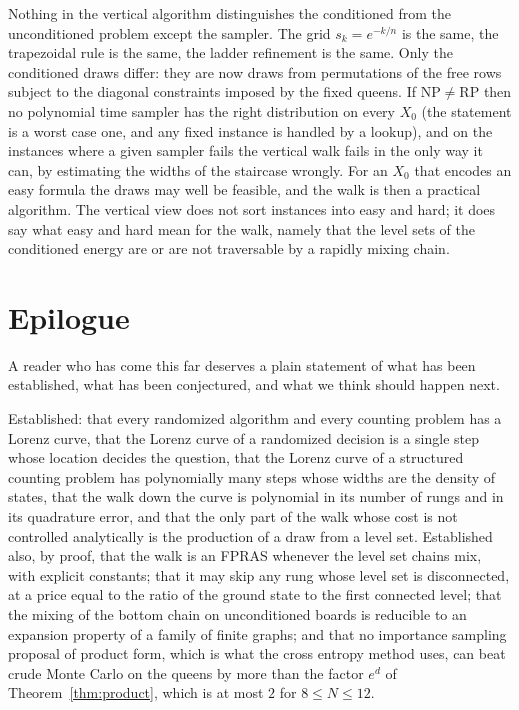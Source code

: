 \documentclass[11pt,twoside,openany]{book}
\theoremstyle{plain}
\theoremstyle{definition}
\theoremstyle{remark}
\newcommand{\RP}{\mathrm{RP}}
\newcommand{\NP}{\mathrm{NP}}
\begin{document}
Nothing in the vertical algorithm distinguishes the conditioned from the unconditioned problem except the sampler. The grid $s_k = e^{-k/n}$ is the same, the trapezoidal rule is the same, the ladder refinement is the same. Only the conditioned draws differ: they are now draws from permutations of the free rows subject to the diagonal constraints imposed by the fixed queens. If $\NP \neq \RP$ then no polynomial time sampler has the right distribution on every $X_0$ (the statement is a worst case one, and any fixed instance is handled by a lookup), and on the instances where a given sampler fails the vertical walk fails in the only way it can, by estimating the widths of the staircase wrongly. For an $X_0$ that encodes an easy formula the draws may well be feasible, and the walk is then a practical algorithm. The vertical view does not sort instances into easy and hard; it does say what easy and hard mean for the walk, namely that the level sets of the conditioned energy are or are not traversable by a rapidly mixing chain.







\chapter*{Epilogue}

A reader who has come this far deserves a plain statement of what has been established, what has been conjectured, and what we think should happen next.

Established: that every randomized algorithm and every counting problem has a Lorenz curve, that the Lorenz curve of a randomized decision is a single step whose location decides the question, that the Lorenz curve of a structured counting problem has polynomially many steps whose widths are the density of states, that the walk down the curve is polynomial in its number of rungs and in its quadrature error, and that the only part of the walk whose cost is not controlled analytically is the production of a draw from a level set. Established also, by proof, that the walk is an FPRAS whenever the level set chains mix, with explicit constants; that it may skip any rung whose level set is disconnected, at a price equal to the ratio of the ground state to the first connected level; that the mixing of the bottom chain on unconditioned boards is reducible to an expansion property of a family of finite graphs; and that no importance sampling proposal of product form, which is what the cross entropy method uses, can beat crude Monte Carlo on the queens by more than the factor $e^{d}$ of Theorem~\ref{thm:product}, which is at most $2$ for $8 \le N \le 12$.
\end{document}

